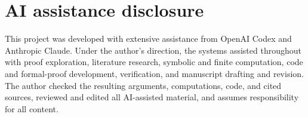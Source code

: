 \documentclass[11pt]{article}
\numberwithin{equation}{section}
\theoremstyle{upright}
\theoremstyle{definition}
\theoremstyle{remark}
\begin{document}
\section*{AI assistance disclosure}

This project was developed with extensive assistance from OpenAI Codex and
Anthropic Claude. Under the author's direction, the systems assisted
throughout with proof exploration, literature research, symbolic and finite
computation, code and formal-proof development, verification, and manuscript
drafting and revision. The author checked the resulting arguments,
computations, code, and cited sources, reviewed and edited all AI-assisted
material, and assumes responsibility for all content.



\end{document}

